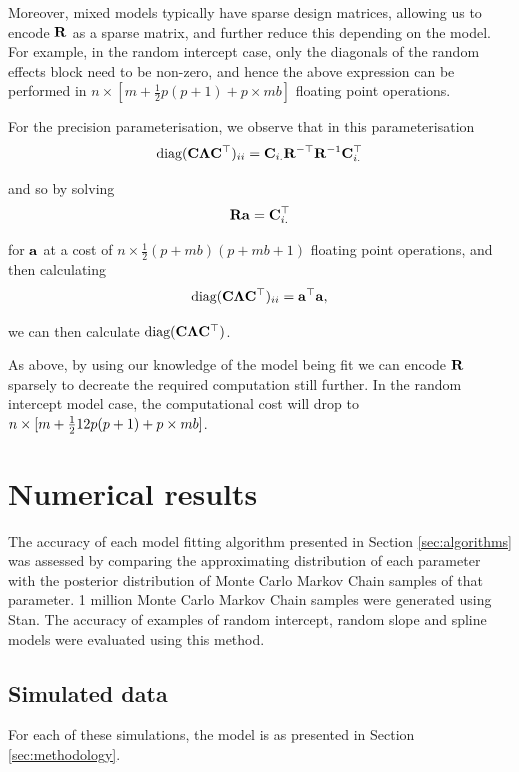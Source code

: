 \documentclass{amsart}[12pt]
\begin{document}
	Moreover, mixed models typically have sparse design matrices, allowing us to encode ${\bf R}$ as a sparse matrix, and	further reduce   this depending on the model. For example, in the random intercept case, only the diagonals of the random effects block need to be non-zero, and hence the above expression can be performed in   $n \times [m + \frac{1}{2} p (p + 1) + p \times m b]$ floating point operations.
	
	
	For the precision parameterisation, we observe that in this parameterisation
	\[
		\text{diag}({\bf C} {\boldsymbol \Lambda} {\bf C}^\top)_{ii} = {\bf C}_{i .} {\bf R}^{-\top} {\bf R}^{-1} {\bf C}_{i .}^\top
	\]
	
	\noindent and so by solving
	\[
		{\bf R} {\bf a} = {\bf C}_{i .}^\top
	\]
	
	\noindent for ${\bf a}$ at a cost of $n \times \frac{1}{2} (p + m b) (p + m b + 1)$ floating point operations, and 
	then calculating
	\[
		\text{diag}({\bf C} {\boldsymbol \Lambda} {\bf C}^\top)_{ii} = {\bf a}^\top {\bf a},
	\]
	
	\noindent we can then calculate $\text{diag}({\bf C} {\boldsymbol \Lambda} {\bf C}^\top)$.
	
	\noindent As above, by using our knowledge of the model being fit we can encode ${\bf R}$ sparsely to decreate
	the required   computation still further. In the random intercept model case, the computational cost will drop
	to   $n \times [m + \tfrac{1}{2}{1}{2} p (p + 1) + p \times m b]$.
	
	\section{Numerical results}
	\label{sec:results}
		
	The accuracy of each model fitting algorithm presented in Section \ref{sec:algorithms} was assessed by
	comparing the approximating distribution of each parameter with the posterior distribution of Monte Carlo
	Markov Chain samples of that parameter. 1 million Monte Carlo Markov Chain samples were generated using Stan.
	The accuracy of examples of random intercept, random slope and spline models were evaluated using this method.
		
	\subsection{Simulated data}
		
	For each of these simulations, the model is as presented in Section \ref{sec:methodology}.
		
\end{document}
